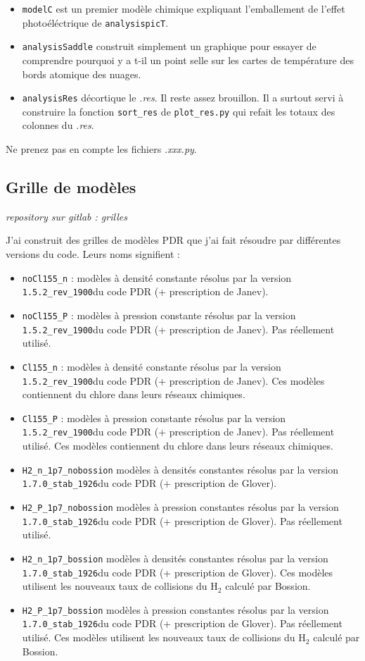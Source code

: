 \documentclass[11pt,a4paper,twoside,openright]{article}
\newcommand{\uncinq}{\texttt{1.5.2\_rev\_1900}}
\newcommand{\unsept}{\texttt{1.7.0\_stab\_1926}}
\begin{document}
\begin{spacing}{0.98}
\begin{itemize}
    \item \texttt{modelC} est un premier modèle chimique expliquant l'emballement de l'effet photoéléctrique de \texttt{analysispicT}.
    \item \texttt{analysisSaddle} construit simplement un graphique pour essayer de comprendre pourquoi y a t-il un point selle sur les cartes de température des bords atomique des nuages.
    \item \texttt{analysisRes} décortique le \textit{.res}. Il reste assez brouillon. Il a surtout servi à construire la fonction \texttt{sort\_res} de \texttt{plot\_res.py} qui refait les totaux des colonnes du \textit{.res}.
\end{itemize}

Ne prenez pas en compte les fichiers \textit{.xxx.py}. 

\subsection{Grille de modèles}

\textit{repository sur gitlab : grilles} \newline

J'ai construit des grilles de modèles PDR que j'ai fait résoudre par différentes versions du code. Leurs noms signifient :
\begin{itemize}
    \item \texttt{noCl155\_n} : modèles à densité constante résolus par la version \uncinq du code PDR (+ prescription de Janev). 
    \item \texttt{noCl155\_P} : modèles à pression constante résolus par la version \uncinq du code PDR (+ prescription de Janev). Pas réellement utilisé.
    \item \texttt{Cl155\_n} : modèles à densité constante résolus par la version \uncinq du code PDR (+ prescription de Janev).  Ces modèles contiennent du chlore dans leurs réseaux chimiques.
    \item \texttt{Cl155\_P} : modèles à pression constante résolus par la version \uncinq du code PDR (+ prescription de Janev). Pas réellement utilisé. Ces modèles contiennent du chlore dans leurs réseaux chimiques.
    \item \texttt{H2\_n\_1p7\_nobossion} modèles à densités constantes résolus par la version \unsept du code PDR (+ prescription de Glover).
    \item \texttt{H2\_P\_1p7\_nobossion} modèles à pression constantes résolus par la version \unsept du code PDR (+ prescription de Glover). Pas réellement utilisé.
    \item \texttt{H2\_n\_1p7\_bossion} modèles à densités constantes résolus par la version \unsept du code PDR (+ prescription de Glover). Ces modèles utilisent les nouveaux taux de collisions du $\mathrm{H}_2$ calculé par Bossion.
    \item \texttt{H2\_P\_1p7\_bossion} modèles à pression constantes résolus par la version \unsept du code PDR (+ prescription de Glover). Pas réellement utilisé. Ces modèles utilisent les nouveaux taux de collisions du $\mathrm{H}_2$ calculé par Bossion.
\end{itemize}


\end{spacing}
\end{document}

